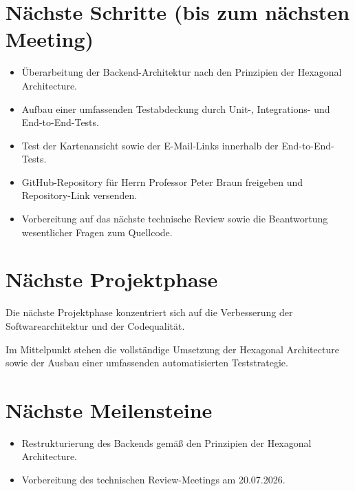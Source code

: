 \documentclass[a4paper,11pt]{article}
\begin{document}
\vspace{0.5cm}

\section{Nächste Schritte (bis zum nächsten Meeting)}

\begin{itemize}[leftmargin=1.2cm]

\item Überarbeitung der Backend-Architektur nach den Prinzipien der Hexagonal Architecture.

\item Aufbau einer umfassenden Testabdeckung durch Unit-, Integrations- und End-to-End-Tests.

\item Test der Kartenansicht sowie der E-Mail-Links innerhalb der End-to-End-Tests.

\item GitHub-Repository für Herrn Professor Peter Braun freigeben und Repository-Link versenden.

\item Vorbereitung auf das nächste technische Review sowie die Beantwortung wesentlicher Fragen zum Quellcode.

\end{itemize}

\vspace{0.5cm}

\section{Nächste Projektphase}

Die nächste Projektphase konzentriert sich auf die Verbesserung der Softwarearchitektur und der Codequalität.

Im Mittelpunkt stehen die vollständige Umsetzung der Hexagonal Architecture sowie der Ausbau einer umfassenden automatisierten Teststrategie.

\vspace{0.5cm}

\section{Nächste Meilensteine}

\begin{itemize}[leftmargin=1.2cm]

\item Restrukturierung des Backends gemäß den Prinzipien der Hexagonal Architecture.

\item Vorbereitung des technischen Review-Meetings am 20.07.2026.

\end{itemize}
\end{document}

